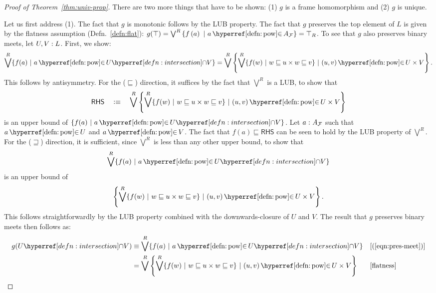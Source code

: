 \begin{proof}[Proof of Theorem~\ref{thm:univ-prop}]
  There are two more things that have to be shown: (1) $g$ is a frame homomorphism and (2)
  $g$ is unique.

  Let us first address (1). The fact that $g$ is monotonic follows by the LUB property.
  The fact that $g$ preserves the top element of $L$ is given by the flatness assumption
  (Defn.~\ref{defn:flat}): $g(\top) = \bigvee^R \img{f}{A_{\McF{}}} = \top_R$. To see that $g$ also
  preserves binary meets, let $U, V:L$. First, we show:
  \begin{equation}\label{eqn:pres-meet}
      \bigvee^R \{ f(a) ~|~ a \mempownm \intersect{U}{V} \}
    = \bigvee^R \setof{ \bigvee^R \{ f(w) ~|~ w \sqsubseteq u \times w \sqsubseteq v \} ~|~ (u, v) \mempownm U \times V }.
  \end{equation}
  This follows by antisymmetry. For the ($\sqsubseteq$) direction, it suffices by the fact that
  $\bigvee^R$ is a LUB, to show that
  \begin{equation*}
    \mathsf{RHS} \quad\is\quad
      \bigvee^R \setof{ \bigvee^R \{ f(w) ~|~ w \sqsubseteq u \times w \sqsubseteq v \} ~|~ (u, v) \mempownm U \times V }
  \end{equation*}
  is an upper bound of $\setof{ f(a) ~|~ \mempow{a}{U \capp V} }$. Let
  $a\hspace{0.1mm}:\hspace{0.1mm}A_{\mathcal{F}{}}$ such that $a \mempownm U$ and $a \mempownm V$. The fact that
  $f(a) \sqsubseteq \mathsf{RHS}$ can be seen to hold by the LUB property of $\bigvee^R$. For the ($\sqsupseteq$)
  direction, it is sufficient, since $\bigvee^R$ is less than any other upper
  bound, to show that
  \begin{equation*}
    \bigvee^R \{ f(a) ~|~ a \mempownm \intersect{U}{V} \}
  \end{equation*}
  is an upper bound of
  \begin{equation*}
    \setof{ \bigvee^R \{ f(w) ~|~ w \sqsubseteq u \times w \sqsubseteq v \} ~|~ (u, v) \mempownm U \times V }.
  \end{equation*}
  This follows straightforwardly by the LUB property combined with the downwards-closure
  of $U$ and $V$. The result that $g$ preserves binary meets then follows as:
  \begin{align*}
    g(\intersect{U}{V}) &\equiv \bigvee^R \{ f(a) ~|~ a \mempownm \intersect{U}{V} \}
               && [\text{(\ref{eqn:pres-meet})}] \\
             &= \bigvee^R \setof{ \bigvee^R \{ f(w) ~|~ w \sqsubseteq u \times w \sqsubseteq v \} ~|~ (u, v) \mempownm U \times V }
               && [\text{flatness}]                                                 \\

\end{align*}
\end{proof}
